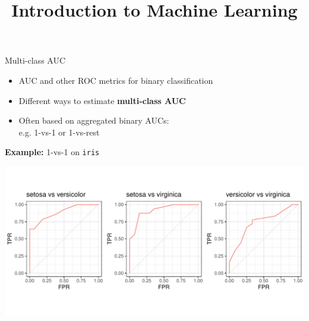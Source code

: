 \documentclass[11pt,compress,t,notes=noshow, xcolor=table]{beamer}
\title{Introduction to Machine Learning}
\institute{\href{https://compstat-lmu.github.io/lecture_i2ml/}{compstat-lmu.github.io/lecture\_i2ml}}
\date{}
\begin{document}
\sloppy



\begin{vbframe}{Multi-class AUC}


\begin{itemize}
  \item AUC and other ROC metrics for binary classification
  \item Different ways to estimate \textbf{multi-class AUC}
  \item Often based on aggregated binary AUCs:\\ %
  e.g. 1-vs-1 or 1-vs-rest
\end{itemize}

\vfill



\textbf{Example:} 1-vs-1 on \texttt{iris}

\centering
\includegraphics[trim = 0 40 -20 40, clip, width=\textwidth]{figure/eval_auc_extensions}




\end{vbframe}
\end{document}
